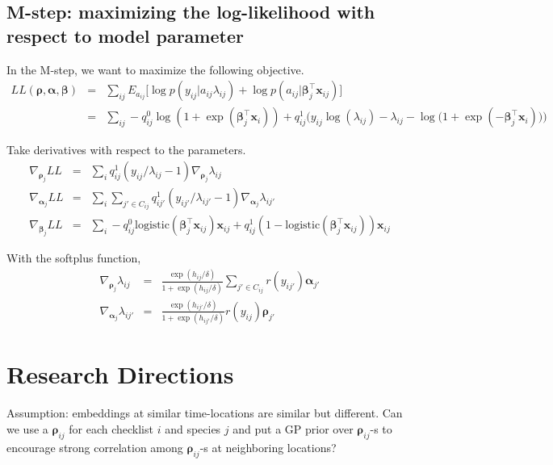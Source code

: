 \documentclass{article}
\newcommand{\wt}{\boldsymbol{\rho}}
\newcommand{\obswt}{\boldsymbol{\beta}}
\newcommand{\emb}{\boldsymbol{\alpha}}
\begin{document}
\subsection{M-step: maximizing the log-likelihood with respect to model parameter}

In the M-step, we want to maximize the following objective. 
\begin{eqnarray}
LL(\wt, \emb, \obswt) &=& \sum_{ij} E_{a_{ij}} \Big[\log p\left(y_{ij} | a_{ij} \lambda_{ij} \right) + \log p\left(a_{ij} | \obswt_j^\top \mathbf{x}_{ij}\right)\Big] \nonumber\\
&=& \sum_{ij}  - q_{ij}^0 \log (1 +  \exp(\obswt_j^\top \mathbf{x}_i)) + q_{ij}^1 \Big( y_{ij}\log(\lambda_{ij}) - \lambda_{ij} - \log \big(1 + \exp( - \obswt_j^\top \mathbf{x}_i) \big) \Big) \nonumber
\end{eqnarray}

Take derivatives with respect to the parameters. 
\begin{eqnarray}
\nabla_{\wt_j} LL &=& \sum_{i}  q_{ij}^1 \left( y_{ij}/\lambda_{ij} - 1 \right)
\nabla_{\wt_j} \lambda_{ij} \\
\nabla_{\emb_j} LL &=& \sum_{i}\sum_{j' \in C_{ij}}  q_{ij'}^1 \left( y_{ij'}/\lambda_{ij'} - 1 \right)
\nabla_{\emb_j} \lambda_{ij'} \\
\nabla_{\obswt_j} LL  &=& \sum_{i} - q_{ij}^0 \mathrm{logistic}(\obswt_j^\top \mathbf{x}_{ij}) \mathbf{x}_{ij} + q_{ij}^1 (1 - \mathrm{logistic}(\obswt_j^\top \mathbf{x}_{ij})) \mathbf{x}_{ij}
\end{eqnarray}

With the softplus function, 
\begin{eqnarray}
\nabla_{\wt_j} \lambda_{ij} &=& \frac{\exp(h_{ij} / \delta)}{1 + \exp(h_{ij} / \delta)} \sum_{j' \in C_{ij}} r(y_{ij'}) \emb_{j'} \\
\nabla_{\emb_{j}} \lambda_{ij'} &=& \frac{\exp(h_{ij'} / \delta)}{1 + \exp(h_{ij'} / \delta)}  r(y_{ij}) \wt_{j'}
\end{eqnarray}

\section{Research Directions}

Assumption: embeddings at similar time-locations are similar but different. Can we use a $\wt_{ij}$ for each checklist $i$ and species $j$ and put a GP prior over $\wt_{ij}$-s to encourage strong correlation among $\wt_{ij}$-s at neighboring locations?  
\end{document}
